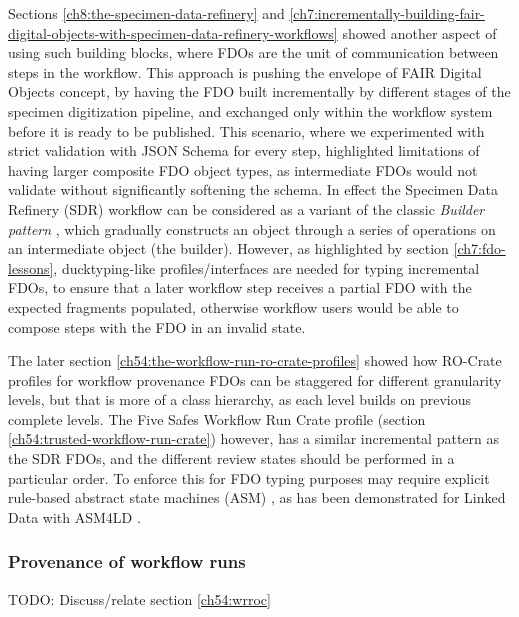 Sections \vref{ch8:the-specimen-data-refinery} and \vref{ch7:incrementally-building-fair-digital-objects-with-specimen-data-refinery-workflows} showed another aspect of using such building blocks, where FDOs are the unit of communication between steps in the workflow. 
This approach is pushing the envelope of FAIR Digital Objects concept, by having the FDO built incrementally by different stages of the specimen digitization pipeline, and exchanged only within the workflow system before it is ready to be published. 
This scenario, where we experimented with strict validation with JSON Schema for every step, highlighted limitations of having larger composite FDO object types, as intermediate FDOs would not validate without significantly softening the schema.
In effect the Specimen Data Refinery (SDR) workflow can be considered as a variant of the classic \emph{Builder pattern} \cite[pp. 97--106]{Gamma 1995}, which gradually constructs an object through a series of operations on an intermediate object (the builder).
However, as highlighted by section \vref{ch7:fdo-lessons}, ducktyping-like profiles/interfaces are needed for typing incremental FDOs, to ensure that a later workflow step receives a partial FDO with the expected fragments populated, otherwise workflow users would be able to compose steps with the FDO in an invalid state. 

The later section \vref{ch54:the-workflow-run-ro-crate-profiles} showed how RO-Crate profiles for workflow provenance FDOs can be staggered for different granularity levels, but that is more of a class hierarchy, as each level builds on previous complete levels.  The Five Safes Workflow Run Crate profile (section \vref{ch54:trusted-workflow-run-crate}) however, has a similar incremental pattern as the SDR FDOs, and the different review states should be performed in a particular order. To enforce this for FDO typing purposes may require explicit rule-based abstract state machines (ASM) \cite{Gurevich 1995}, as has been demonstrated for Linked Data with ASM4LD \cite{Käfer 2018a,Käfer 2018b}.


\subsubsection{Provenance of workflow runs}
\label{ch61:provenance}

\cite{workflow-run-crate}

TODO: Discuss/relate section \vref{ch54:wrroc}




